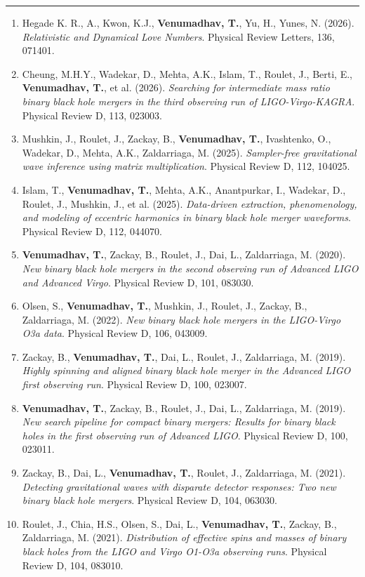 \documentclass[11pt]{article}
\newcommand{\cvsection}[1]{\vspace{5pt}\noindent{\large\bfseries #1}\par\vspace{1pt}\hrule\vspace{3pt}}
\begin{document}
\cvsection{Selected Publications}
\begin{enumerate}
\item Hegade K. R., A., Kwon, K.J., \textbf{Venumadhav, T.}, Yu, H., Yunes, N. (2026). \emph{Relativistic and Dynamical Love Numbers}. Physical Review Letters, 136, 071401.
\item Cheung, M.H.Y., Wadekar, D., Mehta, A.K., Islam, T., Roulet, J., Berti, E., \textbf{Venumadhav, T.}, et al. (2026). \emph{Searching for intermediate mass ratio binary black hole mergers in the third observing run of LIGO-Virgo-KAGRA}. Physical Review D, 113, 023003.
\item Mushkin, J., Roulet, J., Zackay, B., \textbf{Venumadhav, T.}, Ivashtenko, O., Wadekar, D., Mehta, A.K., Zaldarriaga, M. (2025). \emph{Sampler-free gravitational wave inference using matrix multiplication}. Physical Review D, 112, 104025.
\item Islam, T., \textbf{Venumadhav, T.}, Mehta, A.K., Anantpurkar, I., Wadekar, D., Roulet, J., Mushkin, J., et al. (2025). \emph{Data-driven extraction, phenomenology, and modeling of eccentric harmonics in binary black hole merger waveforms}. Physical Review D, 112, 044070.
\item \textbf{Venumadhav, T.}, Zackay, B., Roulet, J., Dai, L., Zaldarriaga, M. (2020). \emph{New binary black hole mergers in the second observing run of Advanced LIGO and Advanced Virgo}. Physical Review D, 101, 083030.
\item Olsen, S., \textbf{Venumadhav, T.}, Mushkin, J., Roulet, J., Zackay, B., Zaldarriaga, M. (2022). \emph{New binary black hole mergers in the LIGO-Virgo O3a data}. Physical Review D, 106, 043009.
\item Zackay, B., \textbf{Venumadhav, T.}, Dai, L., Roulet, J., Zaldarriaga, M. (2019). \emph{Highly spinning and aligned binary black hole merger in the Advanced LIGO first observing run}. Physical Review D, 100, 023007.
\item \textbf{Venumadhav, T.}, Zackay, B., Roulet, J., Dai, L., Zaldarriaga, M. (2019). \emph{New search pipeline for compact binary mergers: Results for binary black holes in the first observing run of Advanced LIGO}. Physical Review D, 100, 023011.
\item Zackay, B., Dai, L., \textbf{Venumadhav, T.}, Roulet, J., Zaldarriaga, M. (2021). \emph{Detecting gravitational waves with disparate detector responses: Two new binary black hole mergers}. Physical Review D, 104, 063030.
\item Roulet, J., Chia, H.S., Olsen, S., Dai, L., \textbf{Venumadhav, T.}, Zackay, B., Zaldarriaga, M. (2021). \emph{Distribution of effective spins and masses of binary black holes from the LIGO and Virgo O1-O3a observing runs}. Physical Review D, 104, 083010.

\end{enumerate}
\end{document}
